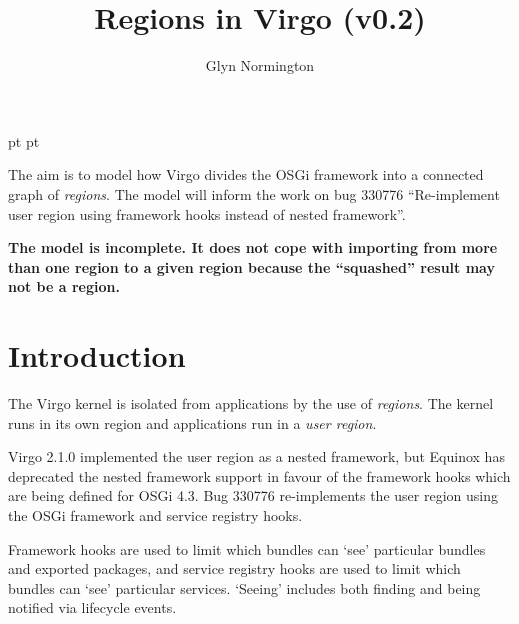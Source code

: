 \documentclass[a4paper,9pt]{article}
\begin{document}
 pt
 pt

\title{Regions in Virgo (v0.2)}
\author{Glyn Normington}
\maketitle
\thispagestyle{myheadings}
\setcounter{page}{0}

The aim is to model how Virgo divides the OSGi framework into a connected graph
of \textit{regions}.
The model will inform the work on bug 330776 ``Re-implement user region using
framework hooks instead of nested framework''.

\textbf{The model is incomplete. It does not cope with importing from more than one region to
a given region because the ``squashed'' result may not be a region.}


\newcommand{\true}{true}
\newcommand{\false}{false}
\newcommand{\ModuleDefZero}{ModuleDef_0}
\newcommand{\ModuleDefOne}{ModuleDef_1}
\newcommand{\ModuleDefTwo}{ModuleDef_2}
\newcommand{\ModuleDefThree}{ModuleDef_3}
\newcommand{\ModuleDefFour}{ModuleDef_4}

\clearpage
{}
\section{Introduction}
\label{cha:intro}

The Virgo kernel is isolated from applications by the use of \textit{regions}.
The kernel runs in its own region and applications run in a \textit{user region}.

Virgo 2.1.0 implemented the user region as a nested framework, but Equinox
has deprecated the nested framework support in favour of the framework hooks
which are being defined for OSGi 4.3.
Bug 330776 re-implements the user region using the OSGi framework and service
registry hooks.

Framework hooks are used to limit which bundles can `see' particular bundles
and exported packages, and service registry hooks are used to limit which bundles
can `see' particular services. `Seeing' includes both finding and being notified via lifecycle events.
\end{document}
